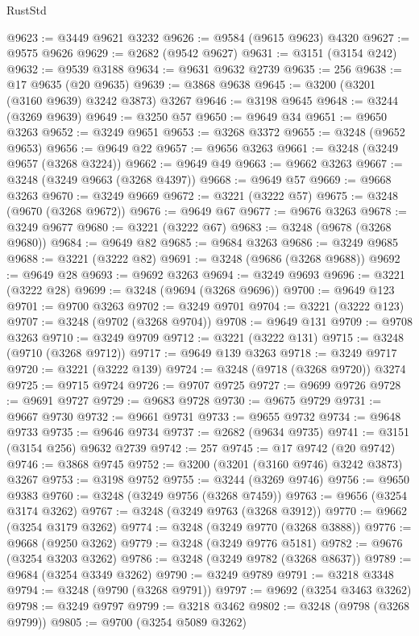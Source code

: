 \begin{lexlean}{RustStd}
\begin{coremodule}
@9623 := @3449 @9621 @3232
@9626 := @9584 (@9615 @9623) @4320
@9627 := @9575 @9626
@9629 := @2682 (@9542 @9627)
@9631 := @3151 (@3154 @242)
@9632 := @9539 @3188
@9634 := @9631 @9632 @2739
@9635 := 256
@9638 := @17 @9635 (@20 @9635)
@9639 := @3868 @9638
@9645 := @3200 (@3201 (@3160 @9639) @3242 @3873) @3267
@9646 := @3198 @9645
@9648 := @3244 (@3269 @9639)
@9649 := @3250 @57
@9650 := @9649 @34
@9651 := @9650 @3263
@9652 := @3249 @9651
@9653 := @3268 @3372
@9655 := @3248 (@9652 @9653)
@9656 := @9649 @22
@9657 := @9656 @3263
@9661 := @3248 (@3249 @9657 (@3268 @3224))
@9662 := @9649 @49
@9663 := @9662 @3263
@9667 := @3248 (@3249 @9663 (@3268 @4397))
@9668 := @9649 @57
@9669 := @9668 @3263
@9670 := @3249 @9669
@9672 := @3221 (@3222 @57)
@9675 := @3248 (@9670 (@3268 @9672))
@9676 := @9649 @67
@9677 := @9676 @3263
@9678 := @3249 @9677
@9680 := @3221 (@3222 @67)
@9683 := @3248 (@9678 (@3268 @9680))
@9684 := @9649 @82
@9685 := @9684 @3263
@9686 := @3249 @9685
@9688 := @3221 (@3222 @82)
@9691 := @3248 (@9686 (@3268 @9688))
@9692 := @9649 @28
@9693 := @9692 @3263
@9694 := @3249 @9693
@9696 := @3221 (@3222 @28)
@9699 := @3248 (@9694 (@3268 @9696))
@9700 := @9649 @123
@9701 := @9700 @3263
@9702 := @3249 @9701
@9704 := @3221 (@3222 @123)
@9707 := @3248 (@9702 (@3268 @9704))
@9708 := @9649 @131
@9709 := @9708 @3263
@9710 := @3249 @9709
@9712 := @3221 (@3222 @131)
@9715 := @3248 (@9710 (@3268 @9712))
@9717 := @9649 @139 @3263
@9718 := @3249 @9717
@9720 := @3221 (@3222 @139)
@9724 := @3248 (@9718 (@3268 @9720)) @3274
@9725 := @9715 @9724
@9726 := @9707 @9725
@9727 := @9699 @9726
@9728 := @9691 @9727
@9729 := @9683 @9728
@9730 := @9675 @9729
@9731 := @9667 @9730
@9732 := @9661 @9731
@9733 := @9655 @9732
@9734 := @9648 @9733
@9735 := @9646 @9734
@9737 := @2682 (@9634 @9735)
@9741 := @3151 (@3154 @256) @9632 @2739
@9742 := 257
@9745 := @17 @9742 (@20 @9742)
@9746 := @3868 @9745
@9752 := @3200 (@3201 (@3160 @9746) @3242 @3873) @3267
@9753 := @3198 @9752
@9755 := @3244 (@3269 @9746)
@9756 := @9650 @9383
@9760 := @3248 (@3249 @9756 (@3268 @7459))
@9763 := @9656 (@3254 @3174 @3262)
@9767 := @3248 (@3249 @9763 (@3268 @3912))
@9770 := @9662 (@3254 @3179 @3262)
@9774 := @3248 (@3249 @9770 (@3268 @3888))
@9776 := @9668 (@9250 @3262)
@9779 := @3248 (@3249 @9776 @5181)
@9782 := @9676 (@3254 @3203 @3262)
@9786 := @3248 (@3249 @9782 (@3268 @8637))
@9789 := @9684 (@3254 @3349 @3262)
@9790 := @3249 @9789
@9791 := @3218 @3348
@9794 := @3248 (@9790 (@3268 @9791))
@9797 := @9692 (@3254 @3463 @3262)
@9798 := @3249 @9797
@9799 := @3218 @3462
@9802 := @3248 (@9798 (@3268 @9799))
@9805 := @9700 (@3254 @5089 @3262)

\end{coremodule}
\end{lexlean}
